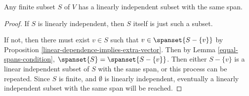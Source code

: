 \documentclass[12pt]{article}
\begin{document}
\begin{prop}\label{linearly-independent-subset-existence}
    Any finite subset $S$ of $V$ has a linearly independent subset with the same span.
\end{prop}

\begin{proof}
    If $S$ is linearly independent, then $S$ itself is just such a subset.

    If not, then there must exist $v \in S$ such that $v \in \spanset{S - \{v\}}$ by Proposition \ref{linear-dependence-implies-extra-vector}. Then by Lemma \ref{equal-spans-condition}, $\spanset{S} = \spanset{S - \{v\}}$. Then either $S - \{v\}$ is a linear independent subset of $S$ with the same span, or this process can be repeated. Since $S$ is finite, and $\emptyset$ is linearly independent, eventually a linearly independent subset with the same span will be reached.
\end{proof}
\end{document}
